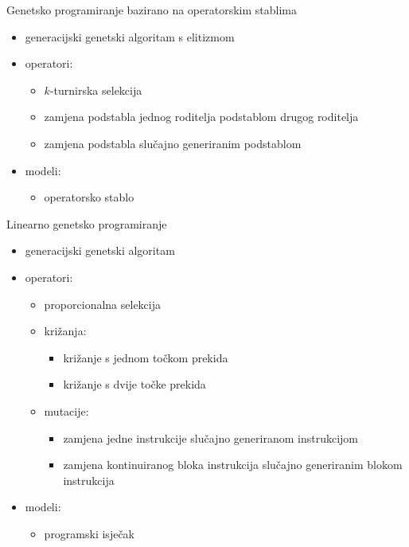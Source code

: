 \begin{frame}{Genetsko programiranje bazirano na operatorskim stablima}
	\begin{itemize}
		\item generacijski genetski algoritam s elitizmom
		\item operatori:
		\begin{itemize}
			\item $k$-turnirska selekcija
			\item zamjena podstabla jednog roditelja podstablom drugog roditelja 
			\item zamjena podstabla slučajno generiranim podstablom
		\end{itemize}
		\item modeli:
		\begin{itemize}
			\item operatorsko stablo
		\end{itemize}
	\end{itemize}
\end{frame}

\begin{frame}{Linearno genetsko programiranje}
	\begin{itemize}
		\item generacijski genetski algoritam
		\item operatori:
		\begin{itemize}
			\item proporcionalna selekcija
			\item križanja:
			\begin{itemize}
				\item križanje s jednom točkom prekida
				\item križanje s dvije točke prekida
			\end{itemize}
			\item mutacije:
			\begin{itemize}
				\item zamjena jedne instrukcije slučajno generiranom instrukcijom
				\item zamjena kontinuiranog bloka instrukcija slučajno generiranim blokom instrukcija
			\end{itemize}
		\end{itemize}
		\item modeli:
		\begin{itemize}
			\item programski isječak
		\end{itemize}
	\end{itemize}
\end{frame}
